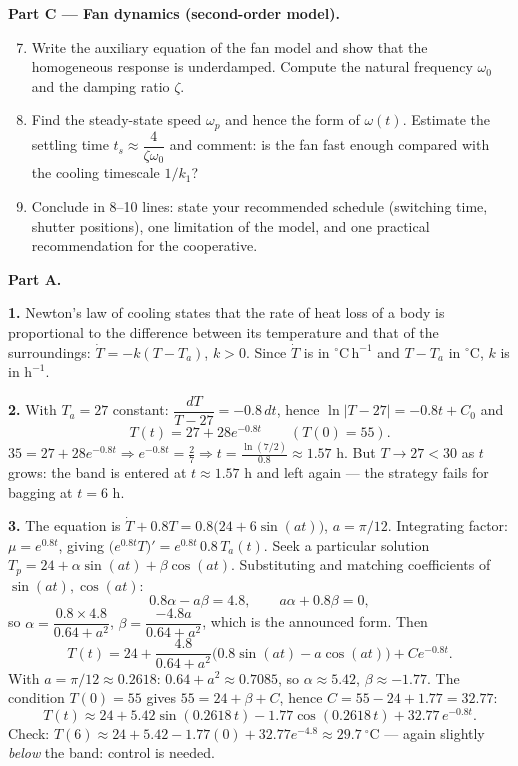 \documentclass[11pt]{article}
\newcounter{popsec}
\newcounter{popsub}
\newcommand{\courssub}[1]{%
  \stepcounter{popsub}%
  \par\vspace{9pt}\noindent{\popxbold\fontsize{11.5}{13}\selectfont\color{popink}{\color{poporange}\thepopsec.\thepopsub}\hspace{6pt}#1}\par\nopagebreak\vspace{4pt}
}
\begin{document}
\textbf{Part C — Fan dynamics (second-order model).}
\begin{enumerate}
\setcounter{enumi}{6}
\item Write the auxiliary equation of the fan model and show that the homogeneous response is underdamped. Compute the natural frequency $\omega_0$ and the damping ratio $\zeta$.
\item Find the steady-state speed $\omega_p$ and hence the form of $\omega(t)$. Estimate the settling time $t_s\approx \dfrac{4}{\zeta\omega_0}$ and comment: is the fan fast enough compared with the cooling timescale $1/k_1$?
\item Conclude in 8--10 lines: state your recommended schedule (switching time, shutter positions), one limitation of the model, and one practical recommendation for the cooperative.
\end{enumerate}

\courssub{Model answer}

\textbf{Part A.}

\textbf{1.} Newton's law of cooling states that the rate of heat loss of a body is proportional to the difference between its temperature and that of the surroundings: $\dot T=-k(T-T_a)$, $k>0$. Since $\dot T$ is in $^{\circ}\mathrm{C\,h^{-1}}$ and $T-T_a$ in $^{\circ}\mathrm{C}$, $k$ is in $\mathrm{h}^{-1}$.

\textbf{2.} With $T_a=27$ constant: $\dfrac{dT}{T-27}=-0.8\,dt$, hence $\ln|T-27|=-0.8t+C_0$ and
\[
T(t)=27+28e^{-0.8t}\qquad (T(0)=55).
\]
$35=27+28e^{-0.8t}\Rightarrow e^{-0.8t}=\frac{2}{7}\Rightarrow t=\frac{\ln(7/2)}{0.8}\approx 1.57$ h. But $T\to 27<30$ as $t$ grows: the band is entered at $t\approx1.57$ h and left again — the strategy fails for bagging at $t=6$ h.

\textbf{3.} The equation is $\dot T+0.8T=0.8\bigl(24+6\sin(at)\bigr)$, $a=\pi/12$. Integrating factor: $\mu=e^{0.8t}$, giving $\bigl(e^{0.8t}T\bigr)'=e^{0.8t}\,0.8\,T_a(t)$. Seek a particular solution $T_p=24+\alpha\sin(at)+\beta\cos(at)$. Substituting and matching coefficients of $\sin(at),\cos(at)$:
\[
0.8\alpha-a\beta=4.8,\qquad a\alpha+0.8\beta=0,
\]
so $\alpha=\dfrac{0.8\times4.8}{0.64+a^2}$, $\beta=\dfrac{-4.8a}{0.64+a^2}$, which is the announced form. Then
\[
T(t)=24+\frac{4.8}{0.64+a^2}\bigl(0.8\sin(at)-a\cos(at)\bigr)+Ce^{-0.8t}.
\]
With $a=\pi/12\approx0.2618$: $0.64+a^2\approx0.7085$, so $\alpha\approx5.42$, $\beta\approx-1.77$. The condition $T(0)=55$ gives $55=24+\beta+C$, hence $C=55-24+1.77=32.77$:
\[
T(t)\approx 24+5.42\sin(0.2618\,t)-1.77\cos(0.2618\,t)+32.77\,e^{-0.8t}.
\]
Check: $T(6)\approx24+5.42-1.77(0)+32.77e^{-4.8}\approx29.7\ ^{\circ}\mathrm{C}$ — again slightly \emph{below} the band: control is needed.
\end{document}
